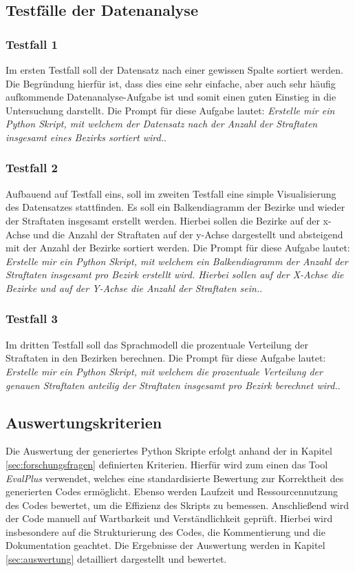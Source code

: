 \documentclass[11pt,a4paper]{article}
\begin{document}
\subsection{Testfälle der Datenanalyse}
\label{sec:testfaelle}
\subsubsection{Testfall 1}
    Im ersten Testfall soll der Datensatz nach einer gewissen Spalte sortiert werden. Die Begründung hierfür ist, dass dies eine sehr einfache, aber auch sehr häufig aufkommende Datenanalyse-Aufgabe ist und somit einen guten Einstieg in die Untersuchung darstellt. Die Prompt für diese Aufgabe lautet: \emph{Erstelle mir ein Python Skript, mit welchem der Datensatz nach der Anzahl der Straftaten insgesamt eines Bezirks sortiert wird.}.

\subsubsection{Testfall 2}
    Aufbauend auf Testfall eins, soll im zweiten Testfall eine simple Visualisierung des Datensatzes stattfinden. Es soll ein Balkendiagramm der Bezirke und wieder der Straftaten insgesamt erstellt werden. Hierbei sollen die Bezirke auf der x-Achse und die Anzahl der Straftaten auf der y-Achse dargestellt und absteigend mit der Anzahl der Bezirke sortiert werden. Die Prompt für diese Aufgabe lautet: \emph{Erstelle mir ein Python Skript, mit welchem ein Balkendiagramm der Anzahl der Straftaten insgesamt pro Bezirk erstellt wird. Hierbei sollen auf der X-Achse die Bezirke und auf der Y-Achse die Anzahl der Straftaten sein.}.

\subsubsection{Testfall 3}
    Im dritten Testfall soll das Sprachmodell die prozentuale Verteilung der Straftaten in den Bezirken berechnen. Die Prompt für diese Aufgabe lautet: \emph{Erstelle mir ein Python Skript, mit welchem die prozentuale Verteilung der genauen Straftaten anteilig der Straftaten insgesamt pro Bezirk berechnet wird.}.


\subsection{Auswertungskriterien}
\label{sec:auswertungskriterien}
    Die Auswertung der generiertes Python Skripte erfolgt anhand der in Kapitel \ref{sec:forschungsfragen} definierten Kriterien. Hierfür wird zum einen das Tool \emph{EvalPlus}\cite{evalplus} verwendet, welches eine standardisierte Bewertung zur Korrektheit des generierten Codes ermöglicht. Ebenso werden Laufzeit und Ressourcennutzung des Codes bewertet, um die Effizienz des Skripts zu bemessen.
    Anschließend wird der Code manuell auf Wartbarkeit und Verständlichkeit geprüft. Hierbei wird insbesondere auf die Strukturierung des Codes, die Kommentierung und die Dokumentation geachtet. Die Ergebnisse der Auswertung werden in Kapitel \ref{sec:auswertung} detailliert dargestellt und bewertet.
\end{document}
